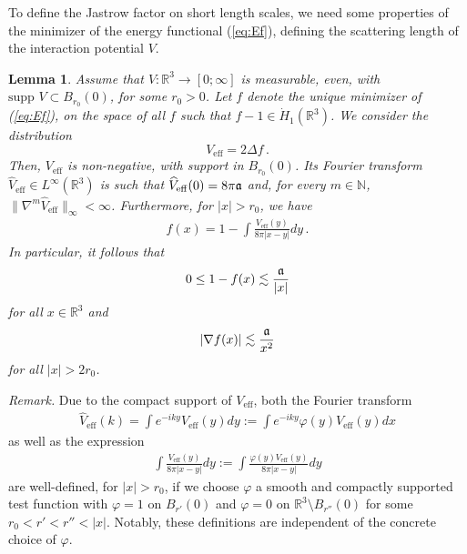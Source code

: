 \documentclass[a4paper,11pt]{article}
\def\bR{\mathbb{R}}
\def\bN{\mathbb{N}}
\newtheorem{lemma}[theorem]{Lemma}
\numberwithin{equation}{section}
\begin{document}
To define the Jastrow factor on short length scales, we need some properties of the minimizer of the energy functional (\ref{eq:Ef}), defining the scattering length of the interaction potential $V$.
\begin{lemma}
\label{Lem:general_potential_eff}
Assume that $V : \bR^3 \to [0;\infty]$ is measurable, even, with $\text{supp } V \subset B_{r_0} (0)$, for some $r_0 > 0$. Let $f$ denote the unique minimizer of (\ref{eq:Ef}), on the space of all $f$ such that $f-1\in \dot{H}_1(\mathbb R^3)$. We consider the distribution 
\begin{equation}\label{eq:Veff} V_\mathrm{eff} = 2\Delta f \, . \end{equation}
Then, $V_\mathrm{eff}$ is non-negative, with support in $B_{r_0}(0)$. Its Fourier transform $\widehat{V}_\mathrm{eff} \in L^\infty (\bR^3)$ is such that $\widehat{V}_\mathrm{eff} (0) = 8\pi \frak{a}$ and, for every $m \in \bN$, $\| \nabla^m \widehat{V}_\mathrm{eff} \|_\infty < \infty$. Furthermore, for $|x|> r_0$, we have 
    \begin{align}
    \label{Eq:formula_f_integ}
        f(x)=1-\int \frac{V_\mathrm{eff}(y)}{8\pi |x-y|} dy\,.
    \end{align}
    In particular, it follows that 
    \begin{equation} \label{eq:1-f} 
    0 \leq 1- f (x) \lesssim \frac{\frak{a}}{|x|} \end{equation} 
    for all $x \in \bR^3$ and 
    \begin{equation}\label{eq:nablaf} |\nabla f (x)| \lesssim \frac{\frak{a}}{x^2} \end{equation} 
for all $|x| > 2 r_0$. \end{lemma}

{\it Remark.} Due to the compact support of $V_\mathrm{eff}$, both the Fourier transform
\begin{align*}
   \widehat{V}_\mathrm{eff}(k) = \int e^{-iky}V_\mathrm{eff}(y) dy := \int e^{-iky} \varphi(y)V_\mathrm{eff}(y) dx
\end{align*}
as well as the expression 
\begin{align}
\label{Eq:extension_to_bounded_func}
    \int \frac{V_\mathrm{eff}(y)}{8\pi |x-y|} dy :=  \int \frac{\varphi(y)V_\mathrm{eff}(y)}{8\pi |x-y|} dy
\end{align}
are well-defined, for $|x| > r_0$, if we choose $\varphi$ a smooth and compactly supported test function with $\varphi=1$ on $B_{r'}(0)$ and $\varphi=0$ on $\mathbb R^3\setminus B_{r''}(0)$ for some $r_0 < r' < r'' < |x|$. Notably, these definitions are independent of the concrete choice of $\varphi$.
\end{document}

